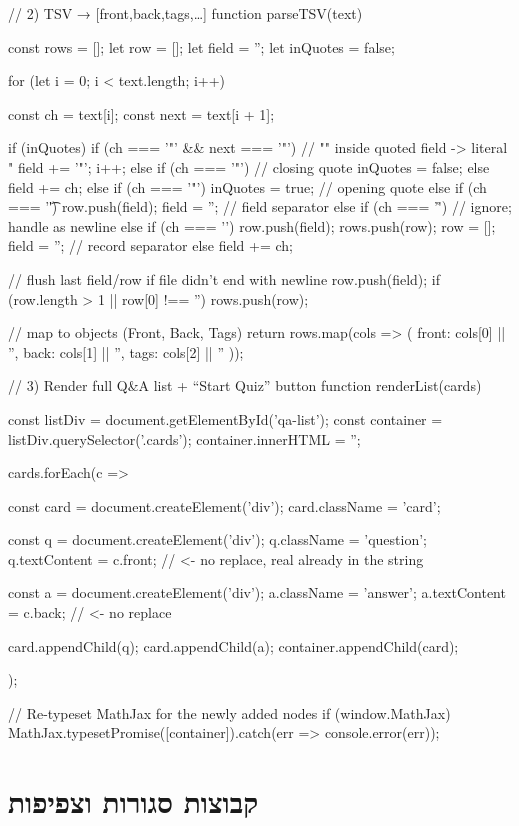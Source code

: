 \documentclass{tstextbook}
\begin{document}
    // 2) TSV → [{front,back,tags},…]
    function parseTSV(text) {
  const rows = [];
  let row = [];
  let field = '';
  let inQuotes = false;

  for (let i = 0; i < text.length; i++) {
    const ch = text[i];
    const next = text[i + 1];

    if (inQuotes) {
      if (ch === '"' && next === '"') {
        // "" inside quoted field -> literal "
        field += '"';
        i++;
      } else if (ch === '"') {
        // closing quote
        inQuotes = false;
      } else {
        field += ch;
      }
    } else {
      if (ch === '"') {
        inQuotes = true;                // opening quote
      } else if (ch === '\t') {
        row.push(field); field = '';    // field separator
      } else if (ch === '\r') {
        // ignore; handle \n as newline
      } else if (ch === '\n') {
        row.push(field); rows.push(row);
        row = []; field = '';           // record separator
      } else {
        field += ch;
      }
    }
  }
  // flush last field/row if file didn't end with newline
  row.push(field);
  if (row.length > 1 || row[0] !== '') rows.push(row);

  // map to objects (Front, Back, Tags)
  return rows.map(cols => ({
    front: cols[0] || '',
    back:  cols[1] || '',
    tags:  cols[2] || ''
  }));
}
// 3) Render full Q&A list + “Start Quiz” button
function renderList(cards) {
  const listDiv = document.getElementById('qa-list');
  const container = listDiv.querySelector('.cards');
  container.innerHTML = '';

  cards.forEach(c => {
    const card = document.createElement('div');
    card.className = 'card';

    const q = document.createElement('div');
    q.className = 'question';
    q.textContent = c.front;   // <- no replace, real \n already in the string

    const a = document.createElement('div');
    a.className = 'answer';
    a.textContent = c.back;    // <- no replace

    card.appendChild(q);
    card.appendChild(a);
    container.appendChild(card);
  });

  // Re-typeset MathJax for the newly added nodes
  if (window.MathJax) {
    MathJax.typesetPromise([container]).catch(err => console.error(err));
  }
}
  \chapter{קבוצות סגורות וצפיפות}
\end{document}
